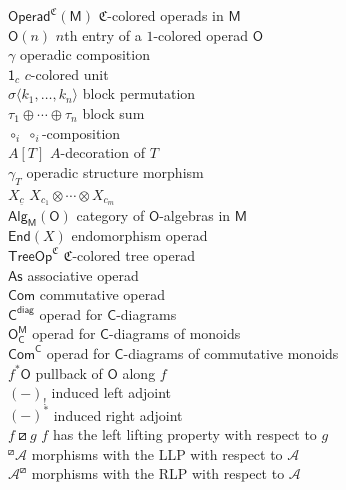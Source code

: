 \documentclass{amsbook}
\numberwithin{section}{chapter}
\numberwithin{subsection}{section}
\numberwithin{equation}{section}
\theoremstyle{plain}
\theoremstyle{definition}
\newcommand{\cala}{\mathcal{A}}
\newcommand{\colorc}{\mathfrak{C}}
\newcommand{\C}{\mathsf{C}}
\newcommand{\M}{\mathsf{M}}
\renewcommand{\O}{\mathsf{O}}
\newcommand{\End}{\mathsf{End}}
\newcommand{\operadunit}{\mathsf{1}}
\newcommand{\compi}{\circ_i}
\newcommand{\fstar}{f^*}
\newcommand{\fstaro}{\fstar\O}
\newcommand{\Ocm}{\O_{\C}^{\M}}
\newcommand{\As}{\mathsf{As}}
\newcommand{\Cdiag}{\C^{\mathsf{diag}}}
\newcommand{\Com}{\mathsf{Com}}
\newcommand{\Comc}{\Com^{\C}}
\newcommand{\Operad}{\mathsf{Operad}}
\newcommand{\Operadc}{\Operad^{\colorc}}
\newcommand{\Operadcm}{\Operadc(\M)}
\newcommand{\Treeopc}{\mathsf{TreeOp}^{\colorc}}
\newcommand{\alg}{\mathsf{Alg}}
\newcommand{\algm}{\alg_{\M}}
\newcommand{\algmo}{\algm(\O)}
\newcommand{\uc}{\underline c}
\begin{document}
\begin{tabbing}
$\Operadcm$  $\colorc$-colored operads in $\M$\\
$\O(n)$  $n$th entry of a $1$-colored operad $\O$\\
$\gamma$  operadic composition\\
$\operadunit_c$  $c$-colored unit\\
$\sigma\langle k_1,\ldots,k_n\rangle$  block permutation\\
$\tau_1 \oplus \cdots \oplus \tau_n$  block sum\\
$\compi$  $\compi$-composition\\
$A[T]$  $A$-decoration of $T$\\
$\gamma_T$  operadic structure morphism\\
$X_{\uc}$  $X_{c_1} \otimes \cdots \otimes X_{c_m}$\\
$\algmo$  category of $\O$-algebras in $\M$\\
$\End(X)$  endomorphism operad\\
$\Treeopc$  $\colorc$-colored tree operad\\
$\As$  associative operad\\
$\Com$  commutative operad\\
$\Cdiag$  operad for $\C$-diagrams\\
$\Ocm$  operad for $\C$-diagrams of monoids\\
$\Comc$  operad for $\C$-diagrams of commutative monoids\\
$\fstaro$  pullback of $\O$ along $f$\\
$(-)_!$  induced left adjoint\\
$(-)^*$  induced right adjoint\\
$f \boxslash g$  $f$ has the left lifting property with respect to $g$\\
$^{\boxslash}\!\cala$  morphisms with the LLP with respect to $\cala$\\
$\cala^{\boxslash}$  morphisms with the RLP with respect to $\cala$\\

\end{tabbing}
\end{document}
